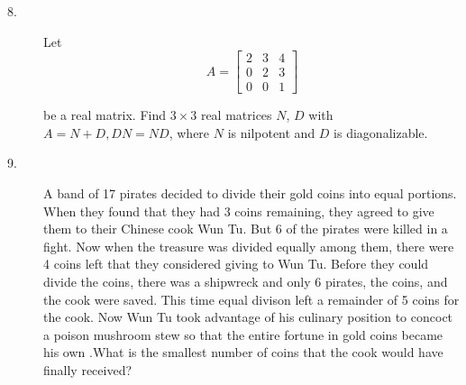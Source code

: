 \documentclass{article}
\begin{document}
\begin{description}
\item[8.]
Let
$$A= \begin{bmatrix} 2&3&4 \\ 0&2&3 \\ 0&0&1 \end{bmatrix}$$

be a real matrix. Find $3 \times 3$ real matrices $N$, $D$ with
$A=N+D, DN = ND$, where $N$ is nilpotent and $D$ is diagonalizable.

\item[9.]
A band of 17 pirates decided to divide their gold coins into equal portions.
When they found that they had 3 coins remaining, they agreed to give them to
their Chinese cook Wun Tu. But 6 of the pirates were killed in a fight. Now
when the treasure was divided equally among them, there were 4 coins left
that they considered giving to Wun Tu. Before they could divide the coins,
there was a shipwreck and only 6 pirates, the coins, and the cook were saved.
This time equal divison left a remainder of 5 coins for the cook. Now Wun
Tu took advantage of his culinary position to concoct a poison mushroom
stew so that the entire fortune in gold coins became his own .What is the
smallest number of coins that the cook would have finally received?






\end{description}    
\end{document}
